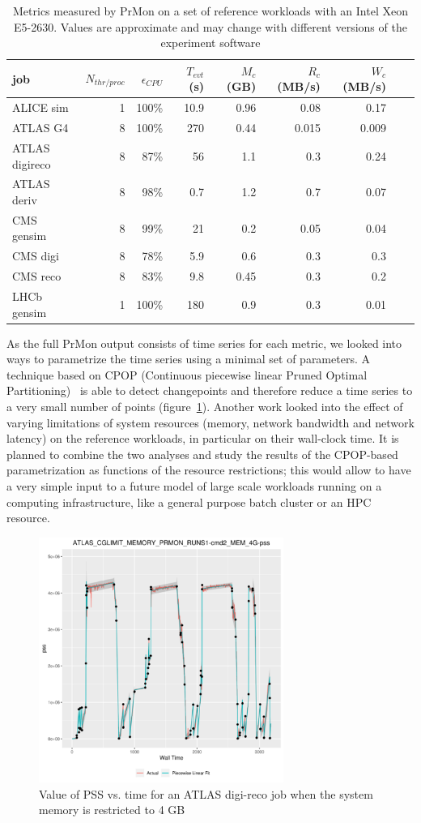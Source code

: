 \begin{table}
\centering
\caption{Metrics measured by PrMon on a set of reference workloads with an Intel Xeon E5-2630. Values are approximate and may change with different versions of the experiment software}
\label{table:prmon}
\begin{tabular}{lrrrrrrrr}
\hline
job & $N_{thr/proc}$ & $\epsilon_{CPU}$ & $T_{evt}$ (s) & $M_{c}$ (GB) & $R_{c}$ (MB/s) & $W_{c}$ (MB/s) \\\hline
ALICE sim & 1 & 100\% & 10.9 & 0.96 & 0.08 & 0.17 \\
ATLAS G4 & 8 & 100\% & 270 & 0.44 & 0.015 & 0.009 \\
ATLAS digireco & 8 & 87\% & 56 & 1.1 & 0.3 & 0.24 \\
ATLAS deriv & 8 & 98\% & 0.7 & 1.2 & 0.7 & 0.07 \\
CMS gensim & 8 & 99\% & 21 & 0.2 & 0.05 & 0.04 \\
CMS digi & 8 & 78\% & 5.9 & 0.6 & 0.3 & 0.3 \\
CMS reco & 8 & 83\% & 9.8 & 0.45 & 0.3 & 0.2 \\
LHCb gensim & 1 & 100\% & 180 & 0.9 & 0.3 & 0.01 \\\hline
\end{tabular}
\end{table}
As the full PrMon output consists of time series for each metric, we
looked into ways to parametrize the time series using a minimal set of
parameters. A technique based on CPOP (Continuous piecewise linear
Pruned Optimal Partitioning)~\cite{cpop} is able to detect
changepoints and therefore reduce a time series to a very small number
of points (figure~\ref{fig:timeseries}). Another work looked into the
effect of varying limitations of system resources (memory, network
bandwidth and network latency) on the reference workloads, in
particular on their wall-clock time. It is planned to combine the two
analyses and study the results of the CPOP-based parametrization as
functions of the resource restrictions; this would allow to have a
very simple input to a future model of large scale workloads running
on a computing infrastructure, like a general purpose batch cluster or
an HPC resource.

\begin{figure}[t]
  \centering
  \includegraphics[height=8cm]{timeseries.png}
  \caption{Value of PSS vs. time for an ATLAS digi-reco job when the
    system memory is restricted to 4 GB}
  \label{fig:timeseries}
\end{figure}

